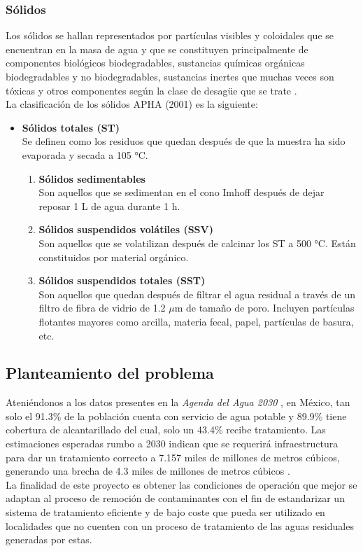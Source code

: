 \subsubsection*{Sólidos}
Los sólidos se hallan representados por partículas  visibles y coloidales que se encuentran en la masa de agua y que se constituyen principalmente de componentes biológicos biodegradables, sustancias químicas orgánicas biodegradables y no biodegradables, sustancias inertes que muchas veces son tóxicas y otros componentes según la clase de desagüe que se trate \emph{\citep{carreno17}}.\\
La clasificación de los sólidos APHA (2001) es la siguiente:
	\begin{small}
	\begin{itemize}
	\item \textbf{Sólidos totales (ST)}\\
	Se definen como los residuos que quedan después de que la muestra ha sido evaporada y secada a 105 °C.
		\begin{enumerate}
		\item \textbf{Sólidos sedimentables}\\
		Son aquellos que se sedimentan en el cono Imhoff después de dejar reposar 1 L de agua durante 1 h.
		\item \textbf{Sólidos suspendidos volátiles (SSV)}\\
		Son aquellos que se volatilizan después de calcinar los ST a 500 °C. Están constituidos por material orgánico.
		\item \textbf{Sólidos suspendidos totales (SST)}\\
		Son aquellos que quedan después de filtrar el agua residual a través de un filtro de fibra de vidrio de 1.2 $\mu$m de tamaño de poro. Incluyen partículas flotantes mayores como arcilla, materia fecal, papel, partículas de basura, etc.
		\end{enumerate}
	\end{itemize}
	\end{small}
\subsection*{Planteamiento del problema}
Ateniéndonos a los datos presentes en la \emph{Agenda del Agua 2030} \emph{\citep{aa2030}}, en México, tan solo el 91.3\% de la población cuenta con servicio de agua potable y 89.9\% tiene cobertura de alcantarillado del cual, solo un 43.4\% recibe tratamiento. Las estimaciones esperadas rumbo a 2030 indican que se requerirá infraestructura para dar un tratamiento correcto a 7.157 miles de millones de metros cúbicos, generando una brecha de 4.3 miles de millones de metros cúbicos \emph{\citep{aa2030}}.\\
La finalidad de este proyecto es obtener las condiciones de operación que mejor se adaptan al proceso de remoción de contaminantes con el fin de estandarizar un sistema de tratamiento eficiente y de bajo coste que pueda ser utilizado en localidades que no cuenten con un proceso de tratamiento de las aguas residuales generadas por estas.
